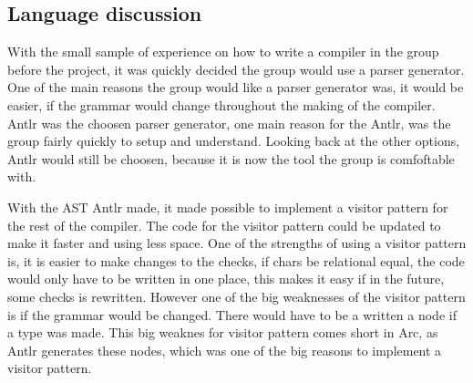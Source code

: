 \subsection*{Language discussion}
    With the small sample of experience on how to write a compiler in the group before the project, it was quickly decided the group would use a parser generator. One of the main reasons the group would like a parser generator was, it would be easier, if the grammar would change throughout the making of the compiler. Antlr was the choosen parser generator, one main reason for the Antlr, was the group fairly quickly to setup and understand. Looking back at the other options, Antlr would still be choosen, because it is now the tool the group is comfoftable with.  

    With the AST Antlr made, it made possible to implement a visitor pattern for the rest of the compiler. The code for the visitor pattern could be updated to make it faster and using less space. One of the strengths of using a visitor pattern is, it is easier to make changes to the checks, if chars be relational equal, the code would only have to be written in one place, this makes it easy if in the future, some checks is rewritten. However one of the big weaknesses of the visitor pattern is if the grammar would be changed. There would have to be a written a node if a type was made. This big weaknes for visitor pattern comes short in Arc, as Antlr generates these nodes, which was one of the big reasons to implement a visitor pattern. 